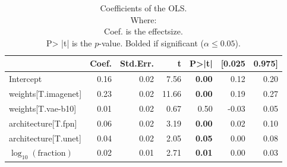 \begin{table}[ht]
\centering
\caption{Coefficients of the OLS.\\Where:\\\hphantom{tabb}Coef. is the effectsize.\\\hphantom{tabb}P> |t| is the $p$-value. Bolded if significant ($\alpha\leq0.05$).}
\label{tab:data_fraction_parameter_influence}
\begin{tabular}{lrrrrrr}
\toprule
 & Coef. & Std.Err. & t & P>|t| & [0.025 & 0.975] \\
\midrule
Intercept & 0.16 & 0.02 & 7.56 & \textbf{0.00} & 0.12 & 0.20 \\
weights[T.imagenet] & 0.23 & 0.02 & 11.66 & \textbf{0.00} & 0.19 & 0.27 \\
weights[T.vae-b10] & 0.01 & 0.02 & 0.67 & 0.50 & -0.03 & 0.05 \\
architecture[T.fpn] & 0.06 & 0.02 & 3.19 & \textbf{0.00} & 0.02 & 0.10 \\
architecture[T.unet] & 0.04 & 0.02 & 2.05 & \textbf{0.05} & 0.00 & 0.08 \\
$\log_{10}(\text{fraction})$ & 0.02 & 0.01 & 2.71 & \textbf{0.01} & 0.00 & 0.03 \\
\bottomrule
\end{tabular}
\end{table}
